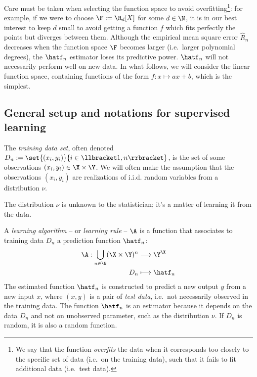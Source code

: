 \documentclass[toc, titlepaged]{../cs-classes/cs-classes}
\begin{document}
Care must be taken when selecting the function space to avoid overfitting\footnote{We say that the function \emph{overfits} the data when it corresponds too closely to the specific set of data (i.e.~on the training data), such that it fails to fit additional data (i.e.~test data).}: for example, if we were to choose $\F:=\R_d[X]$ for some $d\in\N$, it is in our best interest to keep $d$ small to avoid getting a function $f$ which fits perfectly the points but diverges between them. Although the empirical mean square error $\hat{R}_n$ decreases when the function space $\F$ becomes larger (i.e.~larger polynomial degrees), the $\hatf_n$ estimator loses its predictive power. $\hatf_n$ will not necessarily perform well on new data. In what follows, we will consider the linear function space, containing functions of the form $f:x\mapsto ax+b$, which is the simplest.

\subsection{General setup and notations for supervised learning}
\begin{definition}
    The \emph{training data set}, often denoted $D_n:=\set{(x_i, y_i)}{i\in\llbracket 1, n \rrbracket}$, is the set of some observations $(x_i, y_i)\in\X\times\Y$. We will often make the assumption that the observations $(x_i, y_i)$ are realizations of i.i.d. random variables from a distribution $\nu$.
\end{definition}

The distribution $\nu$ is unknown to the statistician; it's a matter of learning it from the data.

\begin{definition}
    A \emph{learning algorithm} -- or \emph{learning rule} -- $\A$ is a function that associates to training data $D_n$ a prediction function $\hatf_n$:
    \begin{equation*}
        \begin{aligned}
            \A: \bigcup_{n\in\N} (\X\times\Y)^n &\longrightarrow \Y^\X\\
            D_n &\longmapsto \hatf_n
        \end{aligned}
    \end{equation*}
    The estimated function $\hatf_n$ is constructed to predict a new output $y$ from a new input $x$, where $(x, y)$ is a pair of \emph{test data}, i.e.~not necessarily observed in the training data. The function $\hatf_n$ is an estimator because it depends on the data $D_n$ and not on unobserved parameter, such as the distribution $\nu$. If $D_n$ is random, it is also a random function.
\end{definition}
\end{document}
